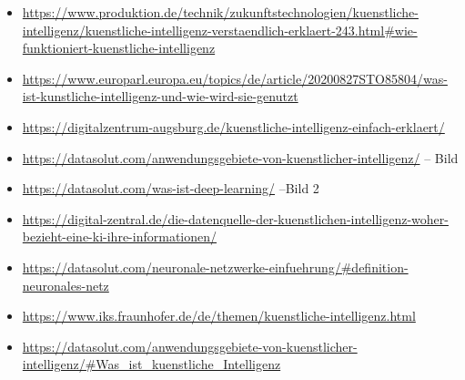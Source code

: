 \documentclass{report}
\begin{document}
\begin{itemize}
  
    
\item \url{https://www.produktion.de/technik/zukunftstechnologien/kuenstliche-intelligenz/kuenstliche-intelligenz-verstaendlich-erklaert-243.html#wie-funktioniert-kuenstliche-intelligenz}
\item \url{https://www.europarl.europa.eu/topics/de/article/20200827STO85804/was-ist-kunstliche-intelligenz-und-wie-wird-sie-genutzt}


\item \url{https://digitalzentrum-augsburg.de/kuenstliche-intelligenz-einfach-erklaert/}
\item \url{https://datasolut.com/anwendungsgebiete-von-kuenstlicher-intelligenz/} -- Bild
\item \url{https://datasolut.com/was-ist-deep-learning/} --Bild 2
\item \url{https://digital-zentral.de/die-datenquelle-der-kuenstlichen-intelligenz-woher-bezieht-eine-ki-ihre-informationen/}
\item \url{https://datasolut.com/neuronale-netzwerke-einfuehrung/#definition-neuronales-netz}
\item \url{https://www.iks.fraunhofer.de/de/themen/kuenstliche-intelligenz.html}
\item \url{https://datasolut.com/anwendungsgebiete-von-kuenstlicher-intelligenz/#Was_ist_kuenstliche_Intelligenz}
\end{itemize}

\printbibliography
\end{document}
